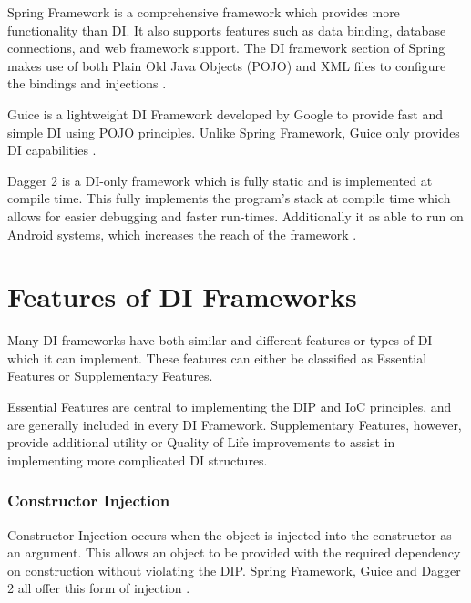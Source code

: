 \documentclass[12pt,twocolumn]{IEEEtran}
\begin{document}
Spring Framework is a comprehensive framework which provides more functionality than DI. It also supports features such as data binding, database connections, and web framework support. The DI framework section of Spring makes use of both Plain Old Java Objects (POJO) and XML files to configure the bindings and injections \cite{spring2019}.

Guice is a lightweight DI Framework developed by Google to provide fast and simple DI using POJO principles. Unlike Spring Framework, Guice only provides DI capabilities \cite{guicewiki2014}.

Dagger 2 is a DI-only framework which is fully static and is implemented at compile time. This fully implements the program's stack at compile time which allows for easier debugging and faster run-times. Additionally it as able to run on Android systems, which increases the reach of the framework \cite{dagger2019}.

\section{Features of DI Frameworks} \label{sec:features}
Many DI frameworks have both similar and different features or types of DI which it can implement. These features can either be classified as Essential Features or Supplementary Features.

Essential Features are central to implementing the DIP and IoC principles, and are generally included in every DI Framework. Supplementary Features, however, provide additional utility or Quality of Life improvements to assist in implementing more complicated DI structures. 


\subsubsection{Constructor Injection} %

Constructor Injection occurs when the object is injected into the constructor as an argument. This allows an object to be provided with the required dependency on construction without violating the DIP. Spring Framework, Guice and Dagger 2 all offer this form of injection \cite{guicewiki2014,spring2019,dagger2019}. 
\end{document}
